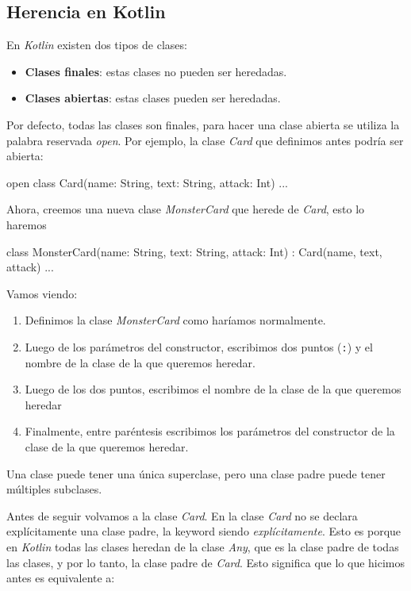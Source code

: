 
\subsection{Herencia en Kotlin}
  En \textit{Kotlin} existen dos tipos de clases:

  \begin{itemize}
    \item \textbf{Clases finales}: estas clases no pueden ser heredadas.
    \item \textbf{Clases abiertas}: estas clases pueden ser heredadas.
  \end{itemize}

  Por defecto, todas las clases son finales, para hacer una clase abierta se utiliza la palabra
  reservada \textit{open}.
  Por ejemplo, la clase \textit{Card} que definimos antes podría ser abierta:

  \begin{kotlin}
    open class Card(name: String, text: String, attack: Int) {...} 
  \end{kotlin}

  Ahora, creemos una nueva clase \textit{MonsterCard} que herede de \textit{Card}, esto lo haremos
                        
  \begin{kotlin}
    class MonsterCard(name: String, text: String, attack: Int) : Card(name, text, attack) {
      ...
    }
  \end{kotlin}

  Vamos viendo:
  \begin{enumerate}
    \item Definimos la clase \textit{MonsterCard} como haríamos normalmente.
    \item Luego de los parámetros del constructor, escribimos dos puntos (\texttt{:}) y el nombre
      de la clase de la que queremos heredar.
    \item Luego de los dos puntos, escribimos el nombre de la clase de la que queremos heredar
    \item Finalmente, entre paréntesis escribimos los parámetros del constructor de la clase
      de la que queremos heredar.
  \end{enumerate}

  \begin{important}
    Una clase puede tener una única superclase, pero una clase padre puede tener múltiples
    subclases.
  \end{important}

  Antes de seguir volvamos a la clase \textit{Card}.
  En la clase \textit{Card} no se declara explícitamente una clase padre, la keyword siendo 
  \textit{explícitamente}.
  Esto es porque en \textit{Kotlin} todas las clases heredan de la clase 
  \textit{Any}\autocite*{BuiltinTypesTheir}, que es la clase padre de todas las clases, y por lo 
  tanto, la clase padre de \textit{Card}.
  Esto significa que lo que hicimos antes es equivalente a:

